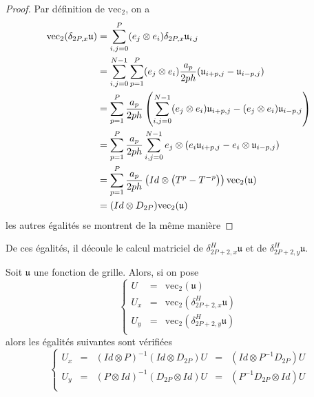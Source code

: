 \begin{proof}
Par définition de $\text{vec}_2$, on a 
\begin{align*}
\text{vec}_2 (\delta_{2P,x} \mathfrak{u}) & = \displaystyle\sum\limits_{i,j=0}^P (e_j \otimes e_i) \delta_{2P,x} \mathfrak{u}_{i,j} \\
	& = \displaystyle\sum\limits_{i,j=0}^{N-1} \displaystyle\sum\limits_{p=1}^P (e_j \otimes e_i) \dfrac{a_p}{2ph} (\mathfrak{u}_{i+p,j} - \mathfrak{u}_{i-p,j}) \\
	& = \displaystyle\sum\limits_{p=1}^P \dfrac{a_p}{2ph} \left( \displaystyle\sum\limits_{i,j=0}^{N-1} (e_j \otimes e_i) \mathfrak{u}_{i+p,j} - (e_j \otimes e_i) \mathfrak{u}_{i-p,j} \right) \\
	& = \displaystyle\sum\limits_{p=1}^P \dfrac{a_p}{2ph} \displaystyle\sum\limits_{i,j=0}^{N-1} e_j \otimes (e_i \mathfrak{u}_{i+p,j} - e_i \otimes \mathfrak{u}_{i-p,j})\\
	& = \displaystyle\sum\limits_{p=1}^P \dfrac{a_p}{2ph} \left( Id \otimes \left( T^p - T^{-p}  \right) \right) \text{vec}_2 (\mathfrak{u}) \\
	& = (Id \otimes D_{2P}) \text{vec}_2 (\mathfrak{u})
\end{align*}
les autres égalités se montrent de la même manière
\end{proof}

De ces égalités, il découle le calcul matriciel de $\delta_{2P+2,x}^H \mathfrak{u}$ et de $\delta_{2P+2,y}^H \mathfrak{u}$.

\begin{theoreme}
Soit $\mathfrak{u}$ une fonction de grille. Alors, si on pose 
\begin{equation}
\left\lbrace
\begin{array}{rcl}
U & = & \text{vec}_2 (\mathfrak{u}) \\
U_x & = & \text{vec}_2 (\delta_{2P+2,x}^H \mathfrak{u}) \\
U_y & = & \text{vec}_2 (\delta_{2P+2,y}^H \mathfrak{u}) \\
\end{array}
\right.
\end{equation}
alors les égalités suivantes sont vérifiées
\begin{equation}
\left\lbrace
\begin{array}{rcccl}
U_x &=& (Id \otimes P)^{-1}(Id \otimes D_{2P}) U &=& (Id \otimes P^{-1}D_{2P})U \\
U_y &=& (P \otimes Id)^{-1}(D_{2P} \otimes Id) U &=& (P^{-1}D_{2P} \otimes Id)U\\
\end{array}
\right.
\end{equation}
\end{theoreme}

